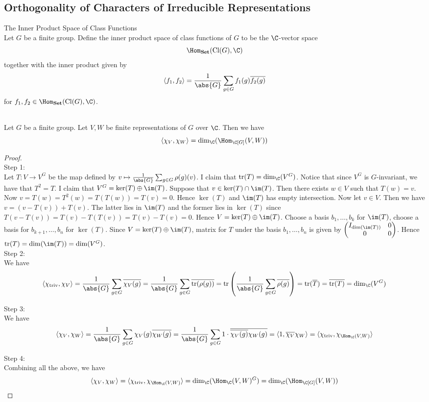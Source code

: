\documentclass[a4paper]{article}
\begin{document}
\subsection{Orthogonality of Characters of Irreducible Representations}
\begin{defn}{The Inner Product Space of Class Functions}{}\\
Let $G$ be a finite group. Define the inner product space of class functions of $G$ to be the $\C$-vector space $$\Hom_{\bold{Set}}(\text{Cl}(G),\C)$$ together with the inner product given by $$\langle f_1,f_2\rangle=\frac{1}{\abs{G}}\sum_{g\in G}f_1(g)\overline{f_2(g)}$$ for $f_1,f_2\in\Hom_{\bold{Set}}(\text{Cl}(G),\C)$. 
\end{defn}

\begin{prp}{}{}\\
Let $G$ be a finite group. Let $V,W$ be finite representations of $G$ over $\C$. Then we have $$\langle\chi_V,\chi_W\rangle=\dim_\C(\Hom_{\C[G]}(V,W))$$
\begin{proof}\\
Step 1: \\
Let $T:V\to V^G$ be the map defined by $v\mapsto\frac{1}{\abs{G}}\sum_{g\in G}\rho(g)(v)$. I claim that $\text{tr}(T)=\dim_\C(V^G)$. Notice that since $V^G$ is $G$-invariant, we have that $T^2=T$. I claim that $V^G=\ker(T)\oplus\im(T)$. Suppose that $v\in\ker(T)\cap\im(T)$. Then there exists $w\in V$ such that $T(w)=v$. Now $v=T(w)=T^2(w)=T(T(w))=T(v)=0$. Hence $\ker(T)$ and $\im(T)$ has empty intersection. Now let $v\in V$. Then we have $v=(v-T(v))+T(v)$. The latter lies in $\im(T)$ and the former lies in $\ker(T)$ since $T(v-T(v))=T(v)-T(T(v))=T(v)-T(v)=0$. Hence $V=\ker(T)\oplus\im(T)$. Choose a basis $b_1,\dots,b_k$ for $\im(T)$, choose a basis for $b_{k+1},\dots,b_n$ for $\ker(T)$. Since $V=\ker(T)\oplus\im(T)$, matrix for $T$ under the basis $b_1,\dots,b_n$ is given by $\begin{pmatrix}
I_{\dim(\im(T))} & 0\\0 & 0
\end{pmatrix}$. Hence $\text{tr}(T)=\dim(\im(T))=\dim(V^G)$. \\

Step 2: \\
We have $$\langle\chi_{\text{triv}},\chi_V\rangle=\frac{1}{\abs{G}}\sum_{g\in G}\overline{\chi_V(g)}=\frac{1}{\abs{G}}\sum_{g\in G}\overline{\text{tr}(\rho(g))}=\text{tr}\left(\frac{1}{\abs{G}}\sum_{g\in G}\overline{\rho(g)}\right)=\text{tr}(\overline{T})=\overline{\text{tr}(T)}=\dim_\C(V^G)$$

Step 3: \\
We have $$\langle\chi_V,\chi_W\rangle=\frac{1}{\abs{G}}\sum_{g\in G}\chi_V(g)\overline{\chi_W(g)}=\frac{1}{\abs{G}}\sum_{g\in G}1\cdot\overline{\overline{\chi_V(g)}\chi_W(g)}=\langle 1,\overline{\chi_V}\chi_W\rangle=\langle\chi_{\text{triv}},\chi_{\Hom_\C(V,W)}\rangle$$

Step 4: \\
Combining all the above, we have $$\langle\chi_V,\chi_W\rangle=\langle\chi_{\text{triv}},\chi_{\Hom_\C(V,W)}\rangle=\dim_\C(\Hom_\C(V,W)^G)=\dim_\C(\Hom_{\C[G]}(V,W))$$
\end{proof}
\end{prp}
\end{document}
